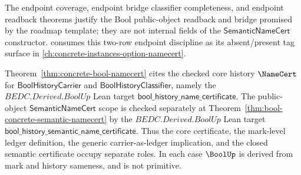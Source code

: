 The endpoint coverage, endpoint bridge classifier completeness, and endpoint
readback theorems justify the Bool public-object readback and bridge promised
by the roadmap template; they are not internal fields of the
$\mathsf{SemanticNameCert}$ constructor.
\OptionUp consumes this two-row endpoint discipline as its absent/present tag
surface in \autoref{ch:concrete-instances-option-namecert}.

\begin{corollary}
\label{cor:bool-certificate-scope}
Theorem~\ref{thm:concrete-bool-namecert} cites the checked core history
$\NameCert$ for $\mathsf{BoolHistoryCarrier}$ and
$\mathsf{BoolHistoryClassifier}$, namely the $BEDC.Derived.BoolUp$ Lean target
$\mathsf{bool\_history\_name\_certificate}$. The public-object
$\mathsf{SemanticNameCert}$ scope is checked separately at
Theorem~\ref{thm:bool-concrete-semantic-namecert} by the $BEDC.Derived.BoolUp$
Lean target $\mathsf{bool\_history\_semantic\_name\_certificate}$. Thus the core
certificate, the mark-level ledger definition, the generic carrier-as-ledger
implication, and the closed semantic certificate occupy separate roles. In each
case $\BoolUp$ is derived from mark and history sameness, and is not primitive.
\end{corollary}

